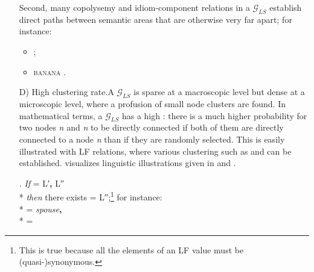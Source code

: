 \begin{enumerate}
\begin{itemize}
\end{itemize}

Second, many copolysemy and idiom-component relations in a $\mathcal{G}_{LS}$ establish direct paths between semantic areas that are otherwise very far apart; for instance:

\begin{itemize}

\item {} \thinspace{}\thinspace{} ;

\item {} \thinspace{}\thinspace\textsc{banana} .

\end{itemize}

\item[D)] High clustering rate.\enskip{}\label{par:highClusteringRate}A $\mathcal{G}_{LS}$ is sparse at a macroscopic level but dense at a microscopic level, where a profusion of small node clusters are found. In mathematical terms, a $\mathcal{G}_{LS}$ has a high : there is a much higher probability for two nodes \textit{n} and \textit{n} to be directly connected if both of them are directly connected to a node \textit{n} than if they are randomly selected. This is easily illustrated with LF relations, where various clustering  such as \Next and \NNext can be established.  visualizes linguistic illustrations given in \Next and \NNext.

\begingroup
\small

\ex.\label{ex:clusteringInfRule1} \emph{If}  = L′\textbf{,} L′′ \\*
         \emph{then} there exists  = L′′;\footnote{This is true because all the elements of an LF value must be (quasi-)synonymous.} for instance:\\*
\textbullet\hspace{2pt}  = \textit{spouse}\textbf{,} \\*
\textbullet\hspace{2pt}  = 


\end{enumerate}
